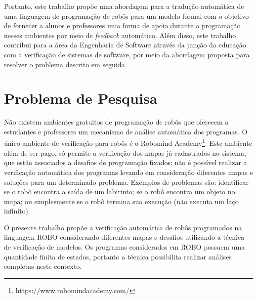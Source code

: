 Portanto, este trabalho propõe uma abordagem para a tradução automática de uma linguagem de programação de robôs para um modelo formal com o objetivo de fornecer a alunos e professores uma forma de apoio durante a programação nesses ambientes por meio de \textit{feedback} automático. Além disso, este trabalho contribui para a área da Engenharia de Software através da junção da educação com a verificação de sistemas de software, por meio da abordagem proposta para resolver o problema descrito em seguida


\section{Problema de Pesquisa}
Não existem ambientes gratuitos de programação de robôs que oferecem a estudantes e professores um mecanismo de análise automática dos programas. O único ambiente de verificação para robôs é o Robomind Academy\footnote[2]{https://www.robomindacademy.com/}. Este ambiente além de ser pago, só permite a verificação dos mapas já cadastrados no sistema, que estão associados a desafios de programação fixados; não é possível realizar a verificação automática dos programas levando em consideração diferentes mapas e soluções para um determinado problema. Exemplos de problemas são: identificar se o robô encontra a saída de um labirinto; se o robô encontra um objeto no mapa; ou simplesmente se o robô termina sua execução (não executa um laço infinito).



O presente trabalho propõe a verificação automática de robôs programados na linguagem ROBO considerando diferentes mapas e desafios utilizando a técnica de verificação de modelos. Os programas considerados em ROBO possuem uma quantidade finita de estados, portanto a técnica possibilita realizar análises completas neste contexto.

